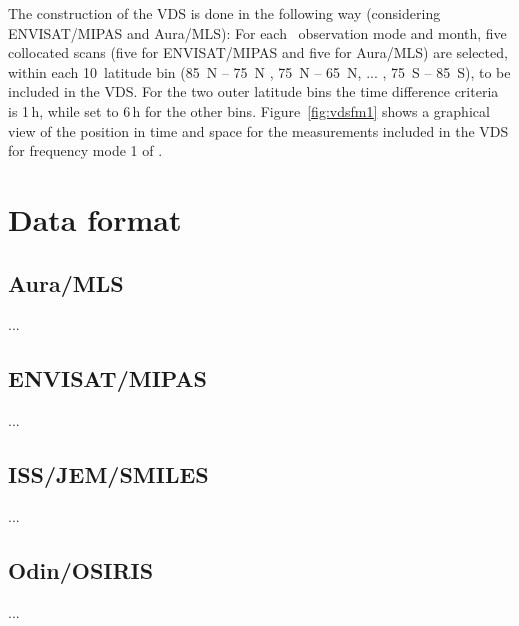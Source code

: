 The construction of the VDS is done in the following way (considering ENVISAT/MIPAS and Aura/MLS):
For each \smr\ observation mode and month, five collocated scans
(five for ENVISAT/MIPAS and five for Aura/MLS)  
are selected, within each 10\degree\ latitude bin
(85\degree\ N -- 75\degree\ N , 75\degree\ N -- 65\degree\ N, ... , 75\degree\ S -- 85\degree\ S),
to be included in the VDS. For the two outer latitude bins the
time difference criteria is 1\,h, while set to 6\,h for the other bins.  
Figure~\ref{fig:vdsfm1} shows a graphical view of the position in
time and space for the measurements included in the VDS for
frequency mode 1 of \smr.   




\section{Data format}
\subsection{Aura/MLS}
...

\subsection{ENVISAT/MIPAS}
...

\subsection{ISS/JEM/SMILES}
...

\subsection{Odin/OSIRIS}
...



